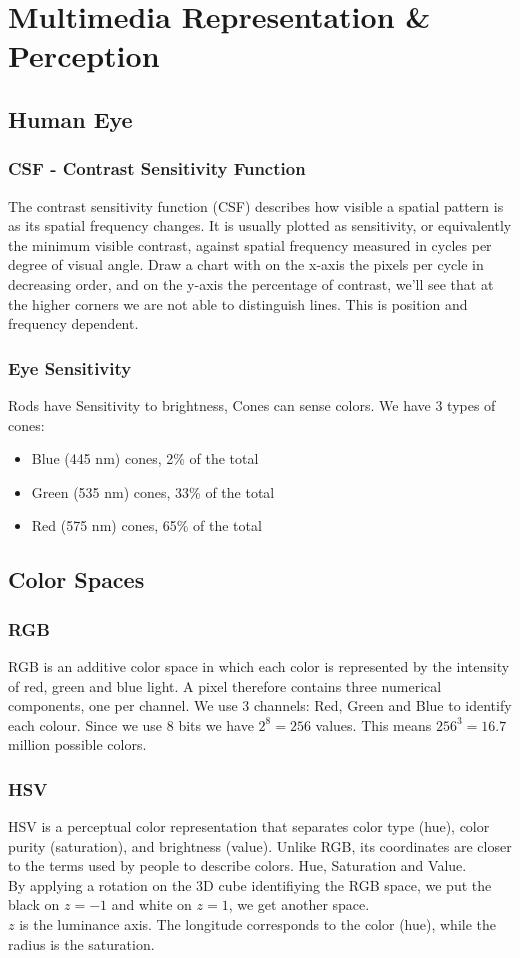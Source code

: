 \section{Multimedia Representation \& Perception}
\subsection{Human Eye}
\subsubsection{CSF - Contrast Sensitivity Function}
The contrast sensitivity function (CSF) describes how visible a spatial pattern is as its spatial frequency changes. It is usually plotted as sensitivity, or equivalently the minimum visible contrast, against spatial frequency measured in cycles per degree of visual angle.
Draw a chart with on the x-axis the pixels per cycle in decreasing order, and on the y-axis the percentage of contrast, we'll see that at the higher corners we are not able to distinguish lines. This is position and frequency dependent.
\subsubsection{Eye Sensitivity}
Rods have Sensitivity to brightness, Cones can sense colors. We have 3 types of cones:
\begin{itemize}
    \item Blue (445 nm) cones, 2\% of the total
    \item Green (535 nm) cones, 33\% of the total
    \item Red (575 nm) cones, 65\% of the total
\end{itemize}
\subsection{Color Spaces}
\subsubsection{RGB}
RGB is an additive color space in which each color is represented by the intensity of red, green and blue light. A pixel therefore contains three numerical components, one per channel.
We use 3 channels: Red, Green and Blue to identify each colour. Since we use 8 bits we have $2^8 = 256$ values. This means $256^3=16.7$ million possible colors.
\subsubsection{HSV}
HSV is a perceptual color representation that separates color type (hue), color purity (saturation), and brightness (value). Unlike RGB, its coordinates are closer to the terms used by people to describe colors.
Hue, Saturation and Value.\\
By applying a rotation on the 3D cube identifiying the RGB space, we put the black on $z=-1$ and white on $z=1$, we get another space.\\
$z$ is the luminance axis. The longitude corresponds to the color (hue), while the radius is the saturation.
